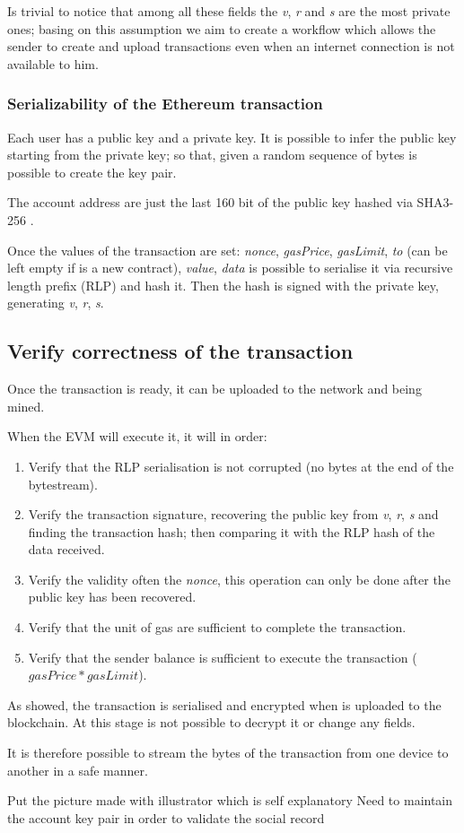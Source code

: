 Is trivial to notice that among all these fields the \textit{v}, \textit{r} and \textit{s} are the most private ones; basing on this assumption we aim to create a workflow which allows the sender to create and upload transactions even when an internet connection is not available to him. 

\subsubsection{Serializability of the Ethereum transaction}
Each user has a public key and a private key. It is possible to infer the public key starting from the private key; so that, given a random sequence of bytes is possible to create the key pair.

The account address are just the last 160 bit of the public key hashed via SHA3-256 \cite{sha3_256_keccak}.

Once the values of the transaction are set: \textit{nonce}, \textit{gasPrice}, \textit{gasLimit}, \textit{to} (can be left empty if is a new contract), \textit{value}, \textit{data} is possible to serialise it via recursive length prefix (RLP) \cite{ethereum_whitepaper} and hash it. Then the hash is signed with the private key, generating \textit{v}, \textit{r}, \textit{s}.

\subsection{Verify correctness of the transaction}
Once the transaction is ready, it can be uploaded to the network and being mined.

When the EVM will execute it, it will in order:
\begin{enumerate}
  \item Verify that the RLP serialisation is not corrupted (no bytes at the end of the bytestream).
  \item Verify the transaction signature, recovering the public key from \textit{v}, \textit{r}, \textit{s} and finding the transaction hash; then comparing it with the RLP hash of the data received.
  \item Verify the validity often the \textit{nonce}, this operation can only be done after the public key has been recovered.
  \item Verify that the unit of gas are sufficient to complete the transaction.
  \item Verify that the sender balance is sufficient to execute the transaction ($gasPrice * gasLimit$).
\end{enumerate}

As showed, the transaction is serialised and encrypted when is uploaded to the blockchain.
At this stage is not possible to decrypt it or change any fields.

It is therefore possible to stream the bytes of the transaction from one device to another in a safe manner.


\begin{notation}
  Put the picture made with illustrator which is self explanatory
  Need to maintain the account key pair in order to validate the social record
\end{notation}